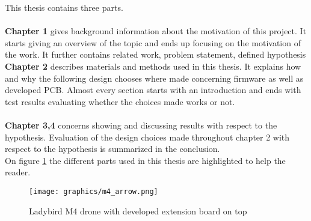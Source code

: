 This thesis contains three parts.\\ \\
\textbf{Chapter 1} gives background information about the motivation of this project.
It starts giving an overview of the topic and ends up focusing on the motivation of the work. It further contains related work,  problem statement, defined hypothesis \\
\textbf{Chapter 2} describes materials and methods used in this thesis. It explains how and why the following design chooses where made concerning firmware as well as developed PCB. Almost every section starts with an introduction and ends with test results evaluating whether the choices made works or not.\\ \\
\textbf{Chapter 3,4} concerns showing and discussing results with respect to the hypothesis. Evaluation of the design choices made throughout chapter 2 with respect to the hypothesis is summarized in the conclusion. \\


On figure \ref{fig:drone_with_arrows} the different parts used in this thesis are highlighted to help the reader.

\begin{figure}[H]
    \center
    \texttt{[image: graphics/m4\_arrow.png]}
  \caption{Ladybird M4 drone with developed extension board on top}
  \label{fig:drone_with_arrows}
\end{figure}

